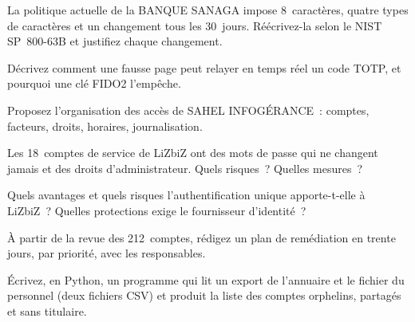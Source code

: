 \begin{boxexo}[title={\ding{45}\quad Exercice~17.4. La politique de mots de passe \niveaumoyen}]
La politique actuelle de la BANQUE SANAGA impose 8~caractères, quatre
types de caractères et un changement tous les 30~jours. Réécrivez-la selon
le NIST SP~800-63B et justifiez chaque changement.
\end{boxexo}

\begin{boxexo}[title={\ding{45}\quad Exercice~17.5. Le relais \niveaumoyen}]
Décrivez comment une fausse page peut relayer en temps réel un code TOTP,
et pourquoi une clé FIDO2 l'empêche.
\end{boxexo}

\begin{boxexo}[title={\ding{45}\quad Exercice~17.6. Le compte du prestataire \niveaumoyen}]
Proposez l'organisation des accès de SAHEL INFOGÉRANCE~: comptes,
facteurs, droits, horaires, journalisation.
\end{boxexo}

\begin{boxexo}[title={\ding{45}\quad Exercice~17.7. Comptes de service \niveaumoyen}]
Les 18~comptes de service de LiZbiZ ont des mots de passe qui ne changent
jamais et des droits d'administrateur. Quels risques~? Quelles mesures~?
\end{boxexo}

\begin{boxexo}[title={\ding{45}\quad Exercice~17.8. SSO \niveaumoyen}]
Quels avantages et quels risques l'authentification unique apporte-t-elle
à LiZbiZ~? Quelles protections exige le fournisseur d'identité~?
\end{boxexo}

\begin{boxexo}[title={\ding{45}\quad Exercice~17.9. Le plan de remédiation \niveauexpert}]
À partir de la revue des 212~comptes, rédigez un plan de remédiation en
trente jours, par priorité, avec les responsables.
\end{boxexo}

\begin{boxexo}[title={\ding{45}\quad Exercice~17.10. Un script de rapprochement \niveauexpert}]
Écrivez, en Python, un programme qui lit un export de l'annuaire et le
fichier du personnel (deux fichiers CSV) et produit la liste des comptes
orphelins, partagés et sans titulaire.
\end{boxexo}

\bigskip

